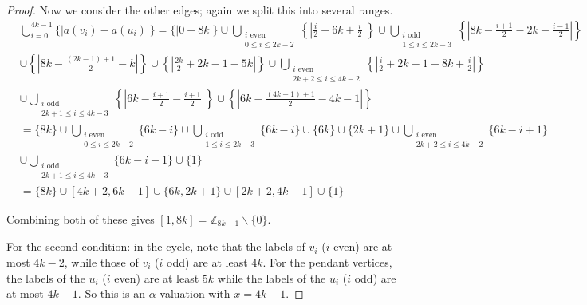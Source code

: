 \documentclass[12pt, a4paper]{article}
\theoremstyle{definition}
\begin{document}
\begin{proof}
Now we consider the other edges; again we split this into several ranges.
\begin{align*}
& \bigcup^{4k-1}_{i=0}\{|a(v_i)-a(u_i)|\}= \{|0-8k|\} \cup \bigcup_{\substack{i \text{ even } \\ 0 \leq i \leq 2k-2}}\left\{\left|\frac{i}{2}-6k+\frac{i}{2}\right|\right\} \cup \bigcup_{\substack{i \text{ odd } \\ 1 \leq i \leq 2k-3}}\left\{\left|8k-\frac{i+1}{2}-2k-\frac{i-1}{2}\right|\right\}\\
& \cup \left\{\left|8k-\frac{(2k-1)+1}{2}-k\right|\right\} \cup \left\{\left|\frac{2k}{2}+2k-1-5k\right|\right\} \cup \bigcup_{\substack{i \text{ even } \\ 2k+2 \leq i \leq 4k-2}}\left\{\left|\frac{i}{2}+2k-1-8k+\frac{i}{2}\right|\right\}\\
&\cup \bigcup_{\substack{i \text{ odd } \\ 2k+1 \leq i \leq 4k-3}}\left\{\left|6k-\frac{i+1}{2}-\frac{i+1}{2}\right|\right\} \cup \left\{\left|6k-\frac{(4k-1)+1}{2}-4k-1\right|\right\}\\
&=\{8k\}\cup \bigcup_{\substack{i \text{ even } \\ 0 \leq i \leq 2k-2}}\{6k-i\} \cup \bigcup_{\substack{i \text{ odd } \\ 1 \leq i \leq 2k-3}}\{6k-i\} \cup\{6k\}\cup\{2k+1\}\cup \bigcup_{\substack{i \text{ even } \\ 2k+2 \leq i \leq 4k-2}}\{6k-i+1\} \\& \cup \bigcup_{\substack{i \text{ odd } \\ 2k+1 \leq i \leq 4k-3}}\{6k-i-1\}\cup\{1\}\\
& =\{8k\}\cup[4k+2,6k-1]\cup\{6k,2k+1\}\cup[2k+2,4k-1]\cup\{1\}
\end{align*}

Combining both of these gives $[1,8k]=\mathbb{Z}_{8k+1}\backslash\{0\}$.  

For the second condition: in the cycle, note that the labels of $v_i$ ($i$ even) are at most $4k-2$, while those of $v_i$ ($i$ odd) are at least $4k$. For the pendant vertices, the labels of the $u_i$ ($i$ even) are at least $5k$ while the labels of the $u_i$ ($i$ odd) are at most $4k-1$. So this is an $\alpha$-valuation with $x=4k-1$.
\end{proof}
\end{document}
